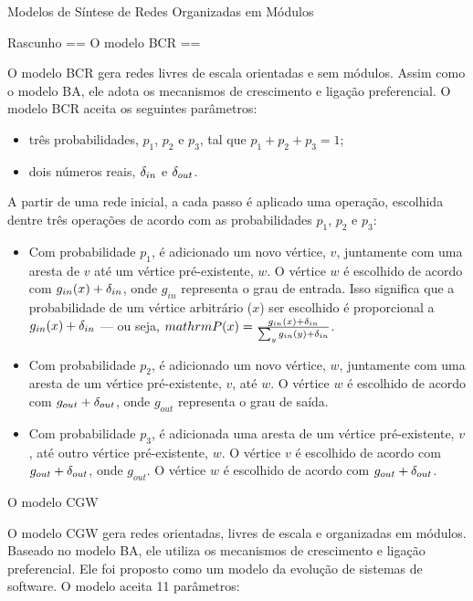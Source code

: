 \begin{section}{Modelos de Síntese de Redes Organizadas em Módulos}
\begin{subsection}{Rascunho}
	== O modelo BCR ==
	
	O modelo BCR gera redes livres de escala orientadas e sem módulos. Assim como o modelo BA, ele adota os mecanismos de crescimento e ligação preferencial. O modelo BCR aceita os seguintes parâmetros:
	
	\begin{itemize}
		\item três probabilidades, $p_1$, $p_2$ e $p_3$, tal que $p_1 + p_2 + p_3 = 1$;
		\item dois números reais, $\delta_{in}$ e $\delta_{out}$.
	\end{itemize}
	
	A partir de uma rede inicial, a cada passo é aplicado uma operação, escolhida dentre três operações de acordo com as probabilidades $p_1$, $p_2$ e $p_3$:
	
	\begin{itemize}
		\item Com probabilidade $p_1$, é adicionado um novo vértice, $v$, juntamente com uma aresta de $v$ até um vértice pré-existente, $w$. O vértice $w$ é escolhido de acordo com $g_{in}(x) + \delta_{in}$, onde $g_{in}$ representa o grau de entrada. Isso significa que a probabilidade de um vértice arbitrário ($x$) ser escolhido é proporcional a $g_{in}(x) + \delta_{in}$ --- ou seja, $mathrm{P}(x) = \frac{g_{in}(x) + \delta_{in}}{\sum_y g_{in}(y) + \delta_{in}}$.
		
		\item Com probabilidade $p_2$, é adicionado um novo vértice, $w$, juntamente com uma aresta de um vértice pré-existente, $v$, até $w$. O vértice $w$ é escolhido de acordo com $g_{out} + \delta_{out}$, onde $g_{out}$ representa o grau de saída.
		
		\item Com probabilidade $p_3$, é adicionada uma aresta de um vértice pré-existente, $v$, até outro vértice pré-existente, $w$. O vértice $v$ é escolhido de acordo com $g_{out} + \delta_{out}$, onde $g_{out}$. O vértice $w$ é escolhido de acordo com $g_{out} + \delta_{out}$.
	\end{itemize}

\end{subsection}

\begin{subsection}{O modelo CGW}

O modelo CGW \cite{Chen2008} gera redes orientadas, livres de escala e organizadas em módulos. Baseado no modelo BA, ele utiliza os mecanismos de crescimento e ligação preferencial. Ele foi proposto como um modelo da evolução de sistemas de software. O modelo aceita 11 parâmetros:


\end{subsection}
\end{section}
